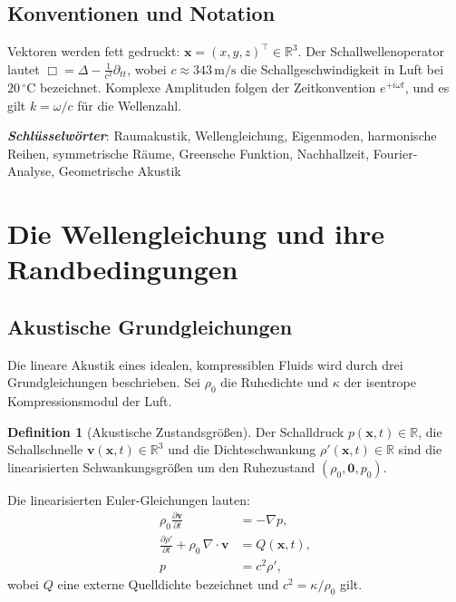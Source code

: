 ﻿\documentclass[12pt, a4paper]{article}
\theoremstyle{definition}
\newtheorem{definition}{Definition}[section]
\theoremstyle{remark}
\newcommand{\R}{\mathbb{R}}
\newcommand{\pfrac}[2]{\frac{\partial #1}{\partial #2}}
\begin{document}
\subsection*{Konventionen und Notation}

Vektoren werden fett gedruckt: $\mathbf{x} = (x,y,z)^\top \in \R^3$.
Der Schallwellenoperator lautet $\Box = \Delta - \frac{1}{c^2}\partial_{tt}$,
wobei $c \approx 343\,\mathrm{m/s}$ die Schallgeschwindigkeit in Luft bei
$20\,^\circ\mathrm{C}$ bezeichnet. Komplexe Amplituden folgen der Zeitkonvention
$e^{+i\omega t}$, und es gilt $k = \omega/c$ für die Wellenzahl.

\textit{\textbf{Schlüsselwörter}}: Raumakustik, Wellengleichung, Eigenmoden,
harmonische Reihen, symmetrische Räume, Greensche Funktion, Nachhallzeit,
Fourier-Analyse, Geometrische Akustik

\section{Die Wellengleichung und ihre Randbedingungen}
\label{sec:wellengleichung}

\subsection{Akustische Grundgleichungen}

Die lineare Akustik eines idealen, kompressiblen Fluids wird durch drei
Grundgleichungen beschrieben. Sei $\rho_0$ die Ruhedichte und $\kappa$
der isentrope Kompressionsmodul der Luft.

\begin{definition}[Akustische Zustandsgrößen]
Der Schalldruck $p(\mathbf{x},t) \in \R$, die Schallschnelle
$\mathbf{v}(\mathbf{x},t) \in \R^3$ und die Dichteschwankung
$\rho'(\mathbf{x},t) \in \R$ sind die linearisierten Schwankungsgrößen
um den Ruhezustand $(\rho_0, \mathbf{0}, p_0)$.
\end{definition}

Die linearisierten Euler-Gleichungen lauten:
\begin{align}
  \rho_0 \pfrac{\mathbf{v}}{t} &= -\nabla p,
  \label{eq:euler}\\[6pt]
  \pfrac{\rho'}{t} + \rho_0\, \nabla \cdot \mathbf{v} &= Q(\mathbf{x},t),
  \label{eq:kontinuitaet}\\[6pt]
  p &= c^2 \rho',
  \label{eq:zustand}
\end{align}
wobei $Q$ eine externe Quelldichte bezeichnet und
$c^2 = \kappa / \rho_0$ gilt.
\end{document}
